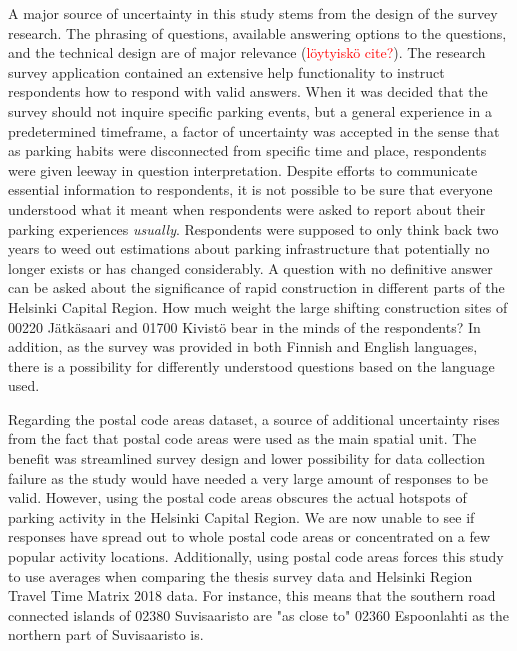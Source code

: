 A major source of uncertainty in this study stems from the design of the survey research. The phrasing of questions, available answering options to the questions, and the technical design are of major relevance (\textcolor{red}{löytyiskö cite?}). The research survey application contained an extensive help functionality to instruct respondents how to respond with valid answers. When it was decided that the survey should not inquire specific parking events, but a general experience in a predetermined timeframe, a factor of uncertainty was accepted in the sense that as parking habits were disconnected from specific time and place, respondents were given leeway in question interpretation. Despite efforts to communicate essential information to respondents, it is not possible to be sure that everyone understood what it meant when respondents were asked to report about their parking experiences \textit{usually}. Respondents were supposed to only think back two years to weed out estimations about parking infrastructure that potentially no longer exists or has changed considerably. A question with no definitive answer can be asked about the significance of rapid construction in different parts of the Helsinki Capital Region. How much weight the large shifting construction sites of 00220 Jätkäsaari and 01700 Kivistö bear in the minds of the respondents? In addition, as the survey was provided in both Finnish and English languages, there is a possibility for differently understood questions based on the language used.

Regarding the postal code areas dataset, a source of additional uncertainty rises from the fact that postal code areas were used as the main spatial unit. The benefit was streamlined survey design and lower possibility for data collection failure as the study would have needed a very large amount of responses to be valid. However, using the postal code areas obscures the actual hotspots of parking activity in the Helsinki Capital Region. We are now unable to see if responses have spread out to whole postal code areas or concentrated on a few popular activity locations. Additionally, using postal code areas forces this study to use averages when comparing the thesis survey data and Helsinki Region Travel Time Matrix 2018 data. For instance, this means that the southern road connected islands of 02380 Suvisaaristo are "as close to" 02360 Espoonlahti as the northern part of Suvisaaristo is.

